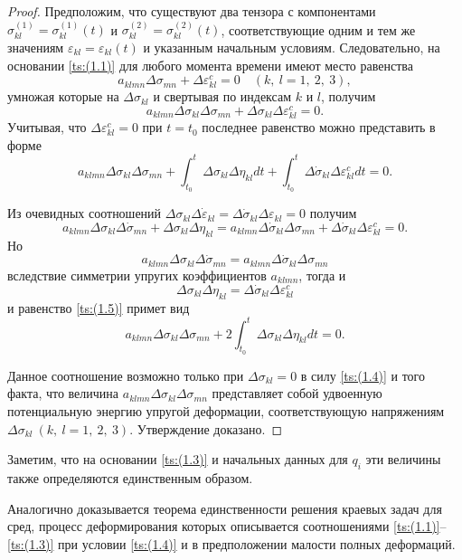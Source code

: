 \rm
\begin{proof}
Предположим, что существуют два тензора с компонентами $\sigma_{kl}^{(1)}=\sigma_{kl}^{(1)}(t)$ и $\sigma_{kl}^{(2)}=\sigma_{kl}^{(2)}(t)$, соответствующие одним и тем же значениям $\varepsilon_{kl}=\varepsilon_{kl}(t)$ и указанным начальным условиям. 
Следовательно, на основании \eqref{ts:(1.1)} для любого момента времени имеют место равенства 
$$a_{klmn}\Delta\sigma_{mn}+\Delta\varepsilon_{kl}^{c}=0\quad  (k,\:l=1,\:2,\:3),$$ 
умножая которые на $\Delta\sigma_{kl}$ и свертывая по индексам $k$ и $l$, получим  $$a_{klmn}\Delta\sigma_{kl}\Delta\sigma_{mn}+\Delta\sigma_{kl}\Delta\varepsilon_{kl}^c=0.$$ 
Учитывая, что $\Delta\varepsilon_{kl}^c=0$ при $t=t_{0}$ последнее равенство можно представить в форме 
\begin{equation}
\label{ts:(1.5)}
a_{klmn}\Delta\sigma_{kl}\Delta\sigma_{mn}+\int_{t_{0}}^{t} \Delta\sigma_{kl}\Delta\eta_{kl}dt+\int_{t_{0}}^{t}\Delta\dot{\sigma}_{kl}\Delta\varepsilon_{kl}^{c}dt=0.
\end{equation}

\smallskip

Из очевидных соотношений $\Delta\sigma_{kl}\Delta\dot{\varepsilon}_{kl}=\Delta\dot{\sigma}_{kl}\Delta\varepsilon_{kl}=0$ получим
$$a_{klmn}\Delta\sigma_{kl}\Delta\dot{\sigma}_{mn}+\Delta\sigma_{kl}\Delta\eta_{kl}=
a_{klmn}\Delta\dot{\sigma}_{kl}\Delta\sigma_{mn}+\Delta\dot{\sigma}_{kl}\Delta\varepsilon_{kl}^{c}=0.$$
Но $$a_{klmn}\Delta\sigma_{kl}\Delta\dot{\sigma}_{mn}=a_{klmn}\Delta\dot{\sigma}_{kl}\Delta\sigma_{mn}$$ вследствие симметрии упругих коэффициентов $a_{klmn}$, 
тогда и $$\Delta\sigma_{kl}\Delta\eta_{kl}=\Delta\dot{\sigma}_{kl}\Delta\varepsilon_{kl}^{c}$$ 
и равенство \eqref{ts:(1.5)} примет вид
$$a_{klmn}\Delta\sigma_{kl}\Delta\sigma_{mn}+2\int_{t_{0}}^{t}\Delta\sigma_{kl}\Delta\eta_{kl}dt=0.$$

Данное соотношение возможно только при $\Delta\sigma_{kl}=0$ в силу \eqref{ts:(1.4)} и того факта, что величина $a_{klmn}\Delta\sigma_{kl}\Delta\sigma_{mn}$ представляет собой удвоенную потенциальную энергию упругой деформации, соответствующую напряжениям $\Delta\sigma_{kl}\ (k,\:l=1,\:2,\:3)$. Утверждение доказано.
\end{proof}

\smallskip

Заметим, что на основании \eqref{ts:(1.3)} и начальных данных для $q_{i}$ эти величины также определяются единственным образом.

Аналогично доказывается теорема единственности решения краевых задач для сред, процесс деформирования которых описывается соотношениями  \eqref{ts:(1.1)}--\eqref{ts:(1.3)} при условии \eqref{ts:(1.4)} и в предположении малости полных деформаций.


